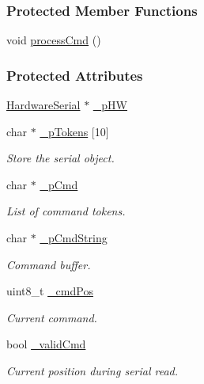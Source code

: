 \subsubsection*{Protected Member Functions}
\begin{DoxyCompactItemize}
\item 
void \hyperlink{class_cmd_processor_a56ce7cebb2a72262ba0d1ba0937739d5}{processCmd} ()
\end{DoxyCompactItemize}
\subsubsection*{Protected Attributes}
\begin{DoxyCompactItemize}
\item 
\hyperlink{class_hardware_serial}{HardwareSerial} $\ast$ \hyperlink{class_cmd_processor_a8df6f12b27223c1f1876ea7221cd2413}{\_\-pHW}
\item 
char $\ast$ \hyperlink{class_cmd_processor_a2b857367533cd33ba9a68746c71c5e3d}{\_\-pTokens} \mbox{[}10\mbox{]}
\begin{DoxyCompactList}\small\item\em Store the serial object. \item\end{DoxyCompactList}\item 
char $\ast$ \hyperlink{class_cmd_processor_a2017c885b275984549385ba246ec37f5}{\_\-pCmd}
\begin{DoxyCompactList}\small\item\em List of command tokens. \item\end{DoxyCompactList}\item 
char $\ast$ \hyperlink{class_cmd_processor_acc77d1f9a20e535e1073950001c0cc36}{\_\-pCmdString}
\begin{DoxyCompactList}\small\item\em Command buffer. \item\end{DoxyCompactList}\item 
uint8\_\-t \hyperlink{class_cmd_processor_a6201596327a378c5317c1f6a8a9d5bc4}{\_\-cmdPos}
\begin{DoxyCompactList}\small\item\em Current command. \item\end{DoxyCompactList}\item 
bool \hyperlink{class_cmd_processor_a18b0886303779762a37096d6446aefa6}{\_\-validCmd}
\begin{DoxyCompactList}\small\item\em Current position during serial read. \item\end{DoxyCompactList}\item 

\end{DoxyCompactItemize}
